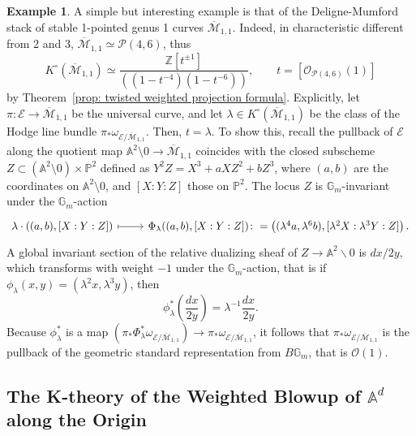 \documentclass[12pt]{amsart}
\newcommand\Gm{\mathbb{G}_m}
\newcommand\A{\mathbb{A}}
\newcommand\Z{\mathbb{Z}}
\newcommand{\bA}{\mathbb{A}}
\newcommand{\bP}{\mathbb{P}}
\newcommand{\sO}{\mathscr{O}}
\newcommand{\cE}{\mathcal{E}}
\newcommand{\cM}{\mathcal{M}}
\newcommand{\cO}{\mathcal{O}}
\newcommand{\cP}{\mathcal{P}}
\newcommand{\Kring}{K^{\circ}}
\theoremstyle{definition}
\newtheorem{Example}[theorem]{Example}
\begin{document}
\begin{Example}\label{example M11}
    A simple but interesting example is that of the Deligne-Mumford stack of stable 1-pointed genus 1 curves $\overline{\cM}_{1,1}$. Indeed, in characteristic different from 2 and 3, $\overline{\cM}_{1,1}\simeq\cP(4,6)$, thus
    \[
        \Kring(\overline{\cM}_{1,1})\simeq\frac{\Z[t^{\pm1}]}{((1-t^{-4})(1-t^{-6}))},\qquad t=[\cO_{\cP(4,6)}(1)]
    \]
    by Theorem~\ref{prop: twisted weighted projection formula}. Explicitly, let $\pi:\cE\rightarrow\overline{\cM}_{1,1}$ be the universal curve, and let $\lambda\in\Kring(\overline{\cM}_{1,1})$ be the class of the Hodge line bundle $\pi_*\omega_{\cE/\overline{\cM}_{1,1}}$. Then, $t=\lambda$. To show this, recall the pullback of $\cE$ along the quotient map $\bA^2\setminus0\rightarrow\overline{\cM}_{1,1}$ coincides with the closed subscheme $Z\subset(\bA^2\setminus0)\times\bP^2$ defined as $Y^2Z=X^3+aXZ^2+bZ^3$, where $(a,b)$ are the coordinates on $\A^2\setminus0$, and $[X:Y:Z]$ those on $\bP^2$. The locus $Z$ is $\Gm$-invariant under the $\Gm$-action
    \[
    \begin{tikzcd}
        \lambda\cdot\left((a,b),[X:Y:Z]\right)\arrow[r,mapsto] & \Phi_\lambda((a,b),[X:Y:Z]) \colon= \left((\lambda^4a,\lambda^6b),[\lambda^2X:\lambda^3Y:Z]\right).
    \end{tikzcd}
    \]
    A global invariant section of the relative dualizing sheaf of $Z \to \mathbb{A}^2 \smallsetminus 0$ is $dx/2y$, which transforms with weight $-1$ under the $\Gm$-action, that is if $\phi_\lambda(x,y)=(\lambda^2 x,\lambda^3 y)$, then
    $$
    \phi_\lambda^*\left(\frac{dx}{2y}\right) = \lambda^{-1}  \frac{dx}{2y}.
    $$
    Because $\phi_\lambda^*$ is a map $( \pi_*  \Phi_\lambda^*\omega_{\mathcal{E}/ \overline{\cM}_{1,1}}) \to \pi_* \omega_{\mathcal{E}/ \overline{\cM}_{1,1}}$, it follows that $\pi_* \omega_{\mathcal{E}/ \overline{\cM}_{1,1}}$ is the pullback of the geometric standard representation from $B \Gm$, that is $\sO(1)$.
\end{Example}

\subsection{The K-theory of the Weighted Blowup of $\bA^d$ along the Origin}\label{sub:K-theory-of-local-weighted-blowup}
\end{document}
